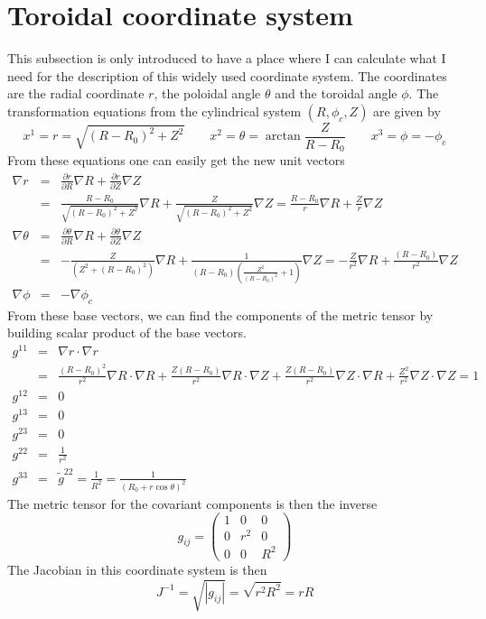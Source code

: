 \documentclass[12pt]{report}
\begin{document}
\section{Toroidal coordinate system}
\label{sec:torsys}
This subsection is only introduced to have a place where I can
calculate what I need for the description of this widely used
coordinate system. The coordinates are the radial coordinate $r$, the
poloidal angle $\theta$ and the toroidal angle $\phi$. The
transformation equations from the cylindrical system $(R,\phi_c,Z)$
are given by
\begin{displaymath}
  x^1=r=\sqrt{(R-R_0)^2+Z^2}
  \qquad x^2=\theta=\arctan\frac{Z}{R-R_0}
  \qquad x^3=\phi=-\phi_c
\end{displaymath}
From these equations one can easily get the new unit vectors
\begin{eqnarray*}
  \nabla r&=&\frac{\partial r}{\partial R}\nabla R
  +\frac{\partial r}{\partial Z}\nabla Z\\
  &=&\frac{R-R_0}{\sqrt{(R-R_0)^2+Z^2}}\nabla R
  +\frac{Z}{\sqrt{(R-R_0)^2+Z^2}}\nabla Z
  =\frac{R-R_0}{r}\nabla R+\frac{Z}{r}\nabla Z\\
  \nabla \theta&=&\frac{\partial\theta}{\partial R}\nabla R
  +\frac{\partial\theta}{\partial Z}\nabla Z\\
  &=&-\frac{Z}{\left(Z^2+(R-R_0)^2\right)}\nabla R
  +\frac{1}{(R-R_0) \left(\frac{Z^2}{(R-R_0)^2}+1\right)}\nabla Z
  =-\frac{Z}{r^2}\nabla R
  +\frac{(R-R_0)}{r^2}\nabla Z\\
  \nabla\phi &=&-\nabla\phi_c
\end{eqnarray*}
From these base vectors, we can find the components of the metric
tensor by building scalar product of the base vectors.
\begin{eqnarray*}
  g^{11} &=& \nabla r\cdot\nabla r \\
  &=&\frac{(R-R_0)^2}{r^2}\nabla R\cdot\nabla R
  +\frac{Z(R-R_0)}{r^2}\nabla R\cdot\nabla Z
  +\frac{Z(R-R_0)}{r^2}\nabla Z\cdot\nabla R
  +\frac{Z^2}{r^2}\nabla Z\cdot\nabla Z
  = 1\\
  g^{12} &=& 0\\
  g^{13} &=& 0\\
  g^{23} &=& 0\\
  g^{22} &=& \frac{1}{r^2}\\
  g^{33} &=& \tilde{g}^{22}=\frac{1}{R^2}=\frac{1}{(R_0+r\cos\theta)^2}
\end{eqnarray*}
The metric tensor for the covariant components is then the inverse
\begin{displaymath}
  g_{ij}=\left(
    \begin{array}{ccc}
      1 & 0 & 0\\
      0 & r^2 & 0\\
      0 & 0 & R^2
    \end{array}\right)
\end{displaymath}
The Jacobian in this coordinate system is then
\begin{displaymath}
  J^{-1}=\sqrt{|g_{ij}|}=\sqrt{r^2R^2}=rR
\end{displaymath}
\end{document}
